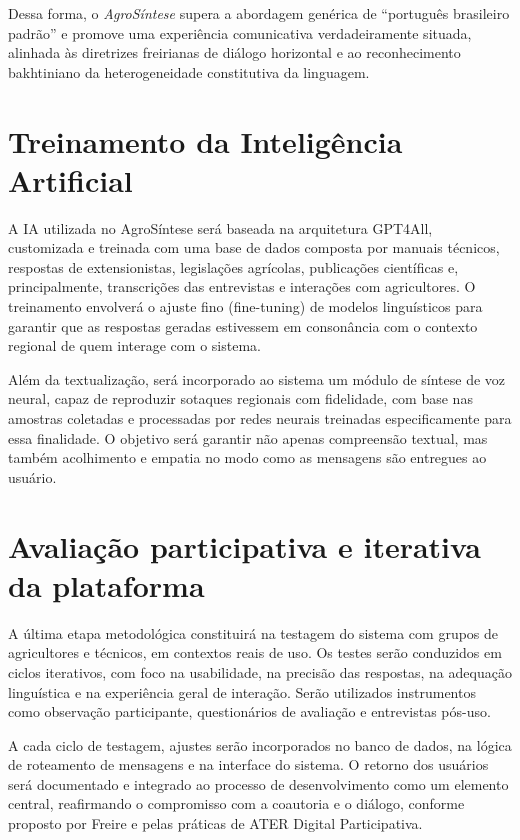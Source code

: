 Dessa forma, o \textit{AgroSíntese} supera a abordagem genérica de “português
brasileiro padrão” e promove uma experiência comunicativa verdadeiramente
situada, alinhada às diretrizes freirianas de diálogo horizontal e ao
reconhecimento bakhtiniano da heterogeneidade constitutiva da linguagem.


\section{Treinamento da Inteligência Artificial}

A IA utilizada no AgroSíntese será baseada na arquitetura GPT4All, customizada e treinada com uma base de dados composta por manuais técnicos, respostas de extensionistas, legislações agrícolas, publicações científicas e, principalmente, transcrições das entrevistas e interações com agricultores. O treinamento envolverá o ajuste fino (fine-tuning) de modelos linguísticos para garantir que as respostas geradas estivessem em consonância com o contexto regional de quem interage com o sistema.

Além da textualização, será incorporado ao sistema um módulo de síntese de voz neural, capaz de reproduzir sotaques regionais com fidelidade, com base nas amostras coletadas e processadas por redes neurais treinadas especificamente para essa finalidade. O objetivo será garantir não apenas compreensão textual, mas também acolhimento e empatia no modo como as mensagens são entregues ao usuário.

\section{Avaliação participativa e iterativa da plataforma}

A última etapa metodológica constituirá na testagem do sistema com grupos de agricultores e técnicos, em contextos reais de uso. Os testes serão conduzidos em ciclos iterativos, com foco na usabilidade, na precisão das respostas, na adequação linguística e na experiência geral de interação. Serão utilizados instrumentos como observação participante, questionários de avaliação e entrevistas pós-uso.

A cada ciclo de testagem, ajustes serão incorporados no banco de dados, na lógica de roteamento de mensagens e na interface do sistema. O retorno dos usuários será documentado e integrado ao processo de desenvolvimento como um elemento central, reafirmando o compromisso com a coautoria e o diálogo, conforme proposto por Freire \cite{freire2013extensao} e pelas práticas de ATER Digital Participativa.

